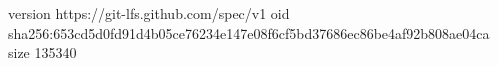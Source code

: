 version https://git-lfs.github.com/spec/v1
oid sha256:653cd5d0fd91d4b05ce76234e147e08f6cf5bd37686ec86be4af92b808ae04ca
size 135340
